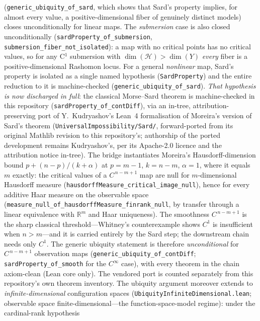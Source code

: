 \documentclass[11pt,a4paper]{article}
\newcommand{\sH}{\mathcal{H}}
\begin{document}
(\texttt{generic\_ubiquity\_of\_sard}, which shows that Sard's property implies, for almost every value,
a positive-dimensional fiber of genuinely distinct models) closes unconditionally for linear maps.  The \emph{submersion} case is also closed unconditionally (\texttt{sardProperty\_of\_submersion},
\texttt{submersion\_fiber\_not\_isolated}): a map with no critical points has no critical values, so
for any C$^1$ submersion with $\dim(\sH) > \dim(Y)$ \emph{every} fiber is a positive-dimensional
Rashomon locus.  For a general \emph{nonlinear} map, Sard's property is isolated as a single named
hypothesis (\texttt{SardProperty}) and the entire reduction to it is machine-checked
(\texttt{generic\_ubiquity\_of\_sard}).  \emph{That hypothesis is now discharged in full}: the
classical Morse--Sard theorem is machine-checked in this repository
(\texttt{sardProperty\_of\_contDiff}), via an in-tree, attribution-preserving port of
Y.~Kudryashov's Lean~4 formalisation \citep{kudryashov2025sardmoreira} of Moreira's version of
Sard's theorem \citep{moreira2001hausdorff}
(\texttt{UniversalImpossibility/Sard/}, forward-ported from its original Mathlib revision to this
repository's; authorship of the ported development remains Kudryashov's, per its Apache-2.0 licence
and the attribution notice in-tree).  The bridge instantiates Moreira's Hausdorff-dimension bound
$p + (n-p)/(k+\alpha)$ at $p = m{-}1$, $k = n{-}m$, $\alpha = 1$, where it equals $m$ exactly: the
critical values of a $C^{\,n-m+1}$ map are null for $m$-dimensional Hausdorff measure
(\texttt{hausdorffMeasure\_critical\_image\_null}), hence for every additive Haar measure on the
observable space (\texttt{measure\_null\_of\_hausdorffMeasure\_finrank\_null}, by transfer through a
linear equivalence with $\mathbb{R}^m$ and Haar uniqueness).  The smoothness $C^{\,n-m+1}$ is the
sharp classical threshold---Whitney's counterexample shows $C^1$ is insufficient when $n > m$---and
it is carried entirely by the Sard step; the downstream chain needs only $C^1$.  The generic
ubiquity statement is therefore \emph{unconditional} for $C^{\,n-m+1}$ observation maps
(\texttt{generic\_ubiquity\_of\_contDiff}; \texttt{sardProperty\_of\_smooth} for the $C^\infty$
case), with every theorem in the chain axiom-clean (Lean core only).  The vendored port is counted
separately from this repository's own theorem inventory.
The ubiquity argument moreover extends to \emph{infinite-dimensional} configuration spaces
(\texttt{UbiquityInfiniteDimensional.lean}; observable space finite-dimensional---the
function-space-model regime): under the cardinal-rank hypothesis
\end{document}

